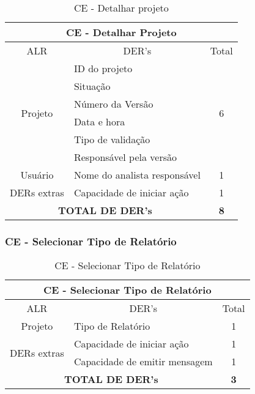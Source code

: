       \begin{table}[!h]
      \centering
      \caption{CE - Detalhar projeto}
      \label{ce_detalhar_projeto}
      \begin{tabular}{|c|l|c|}
      \hline
      \multicolumn{3}{|c|}{CE - Detalhar Projeto}                                  \\ \hline
      ALR                      & \multicolumn{1}{c|}{DER's}   & Total              \\ \hline
      \multirow{6}{*}{Projeto} & ID do projeto                & \multirow{6}{*}{6} \\ \cline{2-2}
			      & Situação                     &                    \\ \cline{2-2}
			      & Número da Versão             &                    \\ \cline{2-2}
			      & Data e hora                  &                    \\ \cline{2-2}
			      & Tipo de validação            &                    \\ \cline{2-2}
			      & Responsável pela versão      &                    \\ \hline
      Usuário                  & Nome do analista responsável & 1                  \\ \hline
      DERs extras              & Capacidade de iniciar ação   & 1                  \\ \hline
      \multicolumn{2}{|c|}{\textbf{TOTAL DE DER's}}           & \textbf{8}         \\ \hline
      \end{tabular}
      \end{table}
      

      
	
   \subsubsection{CE - Selecionar Tipo de Relatório}
      

      \begin{table}[!h]
      \centering
      \caption{CE - Selecionar Tipo de Relatório}
      \label{ce_tipo_relatorio}
      \begin{tabular}{|c|l|c|}
      \hline
      \multicolumn{3}{|c|}{CE - Selecionar Tipo de Relatório}                              \\ \hline
      ALR                          & \multicolumn{1}{c|}{DER's}    & Total        \\ \hline
      Projeto                      & Tipo de Relatório             & 1            \\ \hline
      \multirow{2}{*}{DERs extras} & Capacidade de iniciar ação    & 1            \\ \cline{2-3} 
				  & Capacidade de emitir mensagem & 1            \\ \hline
       \multicolumn{2}{|c|}{\textbf{TOTAL DE DER's}}          & \textbf{3}         \\ \hline
      \end{tabular}
      \end{table}

      
      